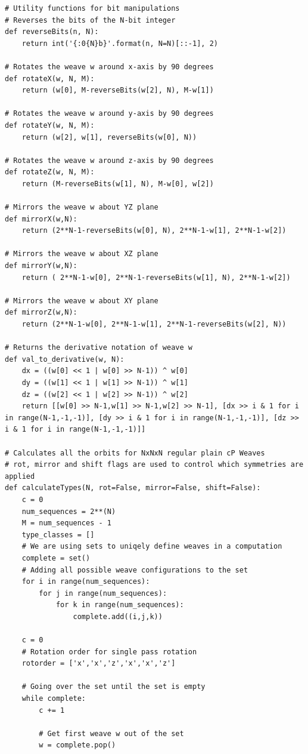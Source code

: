 \documentclass[unnumsec,webpdf,contemporary,large]{oup-authoring-template}%
\theoremstyle{thmstyleone}%
\theoremstyle{thmstyletwo}%
\theoremstyle{thmstylethree}%
\begin{document}
\lstset{language=Python}
\begin{lstlisting}
# Utility functions for bit manipulations
# Reverses the bits of the N-bit integer
def reverseBits(n, N):
    return int('{:0{N}b}'.format(n, N=N)[::-1], 2)

# Rotates the weave w around x-axis by 90 degrees
def rotateX(w, N, M):
    return (w[0], M-reverseBits(w[2], N), M-w[1])

# Rotates the weave w around y-axis by 90 degrees
def rotateY(w, N, M):
    return (w[2], w[1], reverseBits(w[0], N))

# Rotates the weave w around z-axis by 90 degrees
def rotateZ(w, N, M):
    return (M-reverseBits(w[1], N), M-w[0], w[2])

# Mirrors the weave w about YZ plane
def mirrorX(w,N):
    return (2**N-1-reverseBits(w[0], N), 2**N-1-w[1], 2**N-1-w[2])

# Mirrors the weave w about XZ plane
def mirrorY(w,N):
    return ( 2**N-1-w[0], 2**N-1-reverseBits(w[1], N), 2**N-1-w[2])

# Mirrors the weave w about XY plane
def mirrorZ(w,N):
    return (2**N-1-w[0], 2**N-1-w[1], 2**N-1-reverseBits(w[2], N))

# Returns the derivative notation of weave w
def val_to_derivative(w, N):
    dx = ((w[0] << 1 | w[0] >> N-1)) ^ w[0]
    dy = ((w[1] << 1 | w[1] >> N-1)) ^ w[1]
    dz = ((w[2] << 1 | w[2] >> N-1)) ^ w[2]
    return [[w[0] >> N-1,w[1] >> N-1,w[2] >> N-1], [dx >> i & 1 for i in range(N-1,-1,-1)], [dy >> i & 1 for i in range(N-1,-1,-1)], [dz >> i & 1 for i in range(N-1,-1,-1)]]

# Calculates all the orbits for NxNxN regular plain cP Weaves
# rot, mirror and shift flags are used to control which symmetries are applied
def calculateTypes(N, rot=False, mirror=False, shift=False):
    c = 0
    num_sequences = 2**(N)
    M = num_sequences - 1
    type_classes = []
    # We are using sets to uniqely define weaves in a computation
    complete = set()
    # Adding all possible weave configurations to the set
    for i in range(num_sequences):
        for j in range(num_sequences):
            for k in range(num_sequences):
                complete.add((i,j,k))
    
    c = 0 
    # Rotation order for single pass rotation
    rotorder = ['x','x','z','x','x','z']

    # Going over the set until the set is empty
    while complete:
        c += 1

        # Get first weave w out of the set
        w = complete.pop()


\end{lstlisting}
\end{document}
